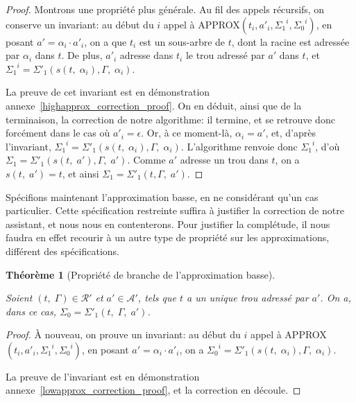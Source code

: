 \documentclass[11pt,a4paper]{article}
\theoremstyle{plain}
\newtheorem{theorem}{Théorème}
\theoremstyle{definition}
\theoremstyle{remark}
\newcommand*{\sequent}{\Gamma}
\newcommand*{\treeaddresses}{\ensuremath{\mathcal{A'}}}
\newcommand*{\representationspartial}{\ensuremath{\mathcal{R'}}}
\newcommand*{\lowapprox}{\ensuremath{\Sigma_0}}
\newcommand*{\highapprox}{\ensuremath{\Sigma_1}}
\newcommand*{\highapproxspec}{\ensuremath{\Sigma'_1}}
\newcommand*{\treesimplify}{\ensuremath{s}}
\begin{document}
\begin{proof}
    Montrons une propriété plus générale. Au fil des appels récursifs, on conserve un invariant: au début du $i$\ieme{} appel à APPROX$(t_i, a'_i, {\highapprox}^i, {\lowapprox}^i)$, en posant $a' = {\alpha}_i \cdot a'_i$, on a que $t_i$ est un sous-arbre de $t$, dont la racine est adressée par ${\alpha}_i$ dans $t$. De plus, $a'_i$ adresse dans $t_i$ le trou adressé par $a'$ dans $t$, et ${\highapprox}^i = \highapproxspec \left( \treesimplify( t, \; {\alpha}_i ), \sequent, \; {\alpha}_i \right)$.

    La preuve de cet invariant est en démonstration annexe~\ref{highapprox_correction_proof}. On en déduit, ainsi que de la terminaison, la correction de notre algorithme: il termine, et se retrouve donc forcément dans le cas où $a'_i = \epsilon$. Or, à ce moment-là, $\alpha_i = a'$, et, d'après l'invariant, ${\highapprox}^i = \highapproxspec \left( \treesimplify( t, \; {\alpha}_i ), \sequent, \; {\alpha}_i \right)$. L'algorithme renvoie donc ${\highapprox}^i$, d'où $\highapprox = \highapproxspec \left( \treesimplify( t, \; a' ), \sequent, \; a' \right)$. Comme $a'$ adresse un trou dans $t$, on a $\treesimplify( t, \; a' ) = t$, et ainsi $\highapprox = \highapproxspec \left( t, \sequent, \; a' \right)$.
\end{proof}

Spécifions maintenant l'approximation basse, en ne considérant qu'un cas particulier. Cette spécification restreinte suffira à justifier la correction de notre assistant, et nous nous en contenterons. Pour justifier la complétude, il nous faudra en effet recourir à un autre type de propriété sur les approximations, différent des spécifications.
    
\begin{theorem}[Propriété de branche de l'approximation basse]
    \label{lowapprox_correction}
    
    Soient $(t, \; \sequent) \in \representationspartial$ et $a' \in \treeaddresses$, tels que $t$ a un unique trou adressé par $a'$.
    On a, dans ce cas, $\lowapprox = \highapproxspec \left( t, \; \sequent, \; a' \right)$. 
\end{theorem}

\begin{proof}
    À nouveau, on prouve un invariant: au début du $i$\ieme{} appel à APPROX$(t_i, a'_i, {\highapprox}^i, {\lowapprox}^i)$, en posant $a' = {\alpha}_i \cdot a'_i$, on a ${\lowapprox}^i = \highapproxspec \left( \treesimplify( t, \; {\alpha}_i ), \sequent, \; {\alpha}_i \right)$.

    La preuve de l'invariant est en démonstration annexe~\ref{lowapprox_correction_proof}, et la correction en découle.
\end{proof}
\end{document}
